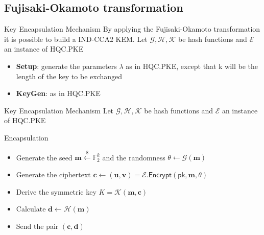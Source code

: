 \subsection{Fujisaki-Okamoto transformation}
\begin{frame}{}
    \subsectionpage
\end{frame}

\begin{frame}{Key Encapsulation Mechanism}
    By applying the Fujisaki-Okamoto transformation it is possible to build a IND-CCA2 KEM.
    Let $\mathcal{G, H, K}$ be hash functions and $\mathcal{E}$ an instance of \textsf{HQC.PKE}
    \begin{block}{}
        \begin{itemize}
            \item \textbf{Setup}: generate the parameters $\lambda$ as in \textsf{HQC.PKE}, except that k will be the length of the key to be exchanged
            \item \textbf{KeyGen}: as in \textsf{HQC.PKE}
        \end{itemize}
    \end{block}
\end{frame}

\begin{frame}{Key Encapsulation Mechanism}
    Let $\mathcal{G, H, K}$ be hash functions and $\mathcal{E}$ an instance of \textsf{HQC.PKE}
    \begin{block}{Encapsulation}
        \begin{itemize}
            \item Generate the seed $\mathbf{m} \xleftarrow{\$} \mathds{F}_2^k$ and the randomness $\theta \leftarrow \mathcal{G}(\mathbf{m})$
            \item Generate the ciphertext $\mathbf{c} \leftarrow (\mathbf{u, v}) = \mathcal{E}.\textsf{Encrypt}(\textsf{pk}, \mathbf{m}, \theta)$
            \item Derive the symmetric key $K = \mathcal{K}(\mathbf{m, c})$
            \item Calculate $\mathbf{d} \leftarrow \mathcal{H}(\mathbf{m})$
            \item Send the pair $(\mathbf{c, d})$
        \end{itemize}
    \end{block}
\end{frame}

